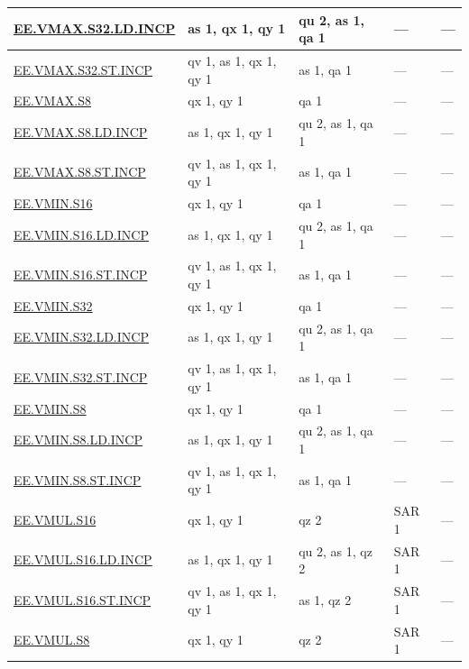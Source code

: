 \begin{longtable}[c]{|l|m{2.5cm}|m{2.5cm}|m{2.5cm}|m{2.5cm}|}
    \hyperref[instruction:EEVMAXS32LDINCP]{EE.VMAX.S32.LD.INCP} & as 1, qx 1, qy 1 & qu 2, as 1, qa 1 & — & — \\\hline
    \hyperref[instruction:EEVMAXS32STINCP]{EE.VMAX.S32.ST.INCP} & qv 1, as 1, qx 1, qy 1 & as 1, qa 1 & — & — \\\hline
    \hyperref[instruction:EEVMAXS8]{EE.VMAX.S8} & qx 1, qy 1 & qa 1 & — & — \\\hline
    \hyperref[instruction:EEVMAXS8LDINCP]{EE.VMAX.S8.LD.INCP} & as 1, qx 1, qy 1 & qu 2, as 1, qa 1 & — & — \\\hline
    \hyperref[instruction:EEVMAXS8STINCP]{EE.VMAX.S8.ST.INCP} & qv 1, as 1, qx 1, qy 1 & as 1, qa 1 & — & — \\\hline
    \hyperref[instruction:EEVMINS16]{EE.VMIN.S16} & qx 1, qy 1 & qa 1 & — & — \\\hline
    \hyperref[instruction:EEVMINS16LDINCP]{EE.VMIN.S16.LD.INCP} & as 1, qx 1, qy 1 & qu 2, as 1, qa 1 & — & — \\\hline
    \hyperref[instruction:EEVMINS16STINCP]{EE.VMIN.S16.ST.INCP} & qv 1, as 1, qx 1, qy 1 & as 1, qa 1 & — & — \\\hline
    \hyperref[instruction:EEVMINS32]{EE.VMIN.S32} & qx 1, qy 1 & qa 1 & — & — \\\hline
    \hyperref[instruction:EEVMINS32LDINCP]{EE.VMIN.S32.LD.INCP} & as 1, qx 1, qy 1 & qu 2, as 1, qa 1 & — & — \\\hline
    \hyperref[instruction:EEVMINS32STINCP]{EE.VMIN.S32.ST.INCP} & qv 1, as 1, qx 1, qy 1 & as 1, qa 1 & — & — \\\hline
    \hyperref[instruction:EEVMINS8]{EE.VMIN.S8} & qx 1, qy 1 & qa 1 & — & — \\\hline
    \hyperref[instruction:EEVMINS8LDINCP]{EE.VMIN.S8.LD.INCP} & as 1, qx 1, qy 1 & qu 2, as 1, qa 1 & — & — \\\hline
    \hyperref[instruction:EEVMINS8STINCP]{EE.VMIN.S8.ST.INCP} & qv 1, as 1, qx 1, qy 1 & as 1, qa 1 & — & — \\\hline
    \hyperref[instruction:EEVMULS16]{EE.VMUL.S16} & qx 1, qy 1 & qz 2 & SAR 1 & — \\\hline
    \hyperref[instruction:EEVMULS16LDINCP]{EE.VMUL.S16.LD.INCP} & as 1, qx 1, qy 1 & qu 2, as 1, qz 2 & SAR 1 & — \\\hline
    \hyperref[instruction:EEVMULS16STINCP]{EE.VMUL.S16.ST.INCP} & qv 1, as 1, qx 1, qy 1 & as 1, qz 2 & SAR 1 & — \\\hline
    \hyperref[instruction:EEVMULS8]{EE.VMUL.S8} & qx 1, qy 1 & qz 2 & SAR 1 & — \\\hline

\end{longtable}
